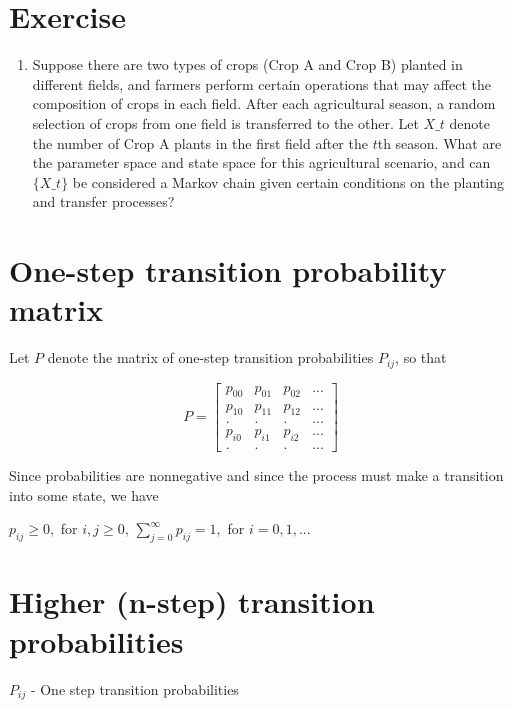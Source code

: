 \documentclass[
  letterpaper,
  DIV=11,
  numbers=noendperiod]{scrreprt}
\providecommand{\tightlist}{%
  \setlength{\itemsep}{0pt}\setlength{\parskip}{0pt}}\usepackage{longtable,booktabs,array}
\begin{document}
\section{Exercise}\label{exercise}

\begin{enumerate}
\def\labelenumi{\arabic{enumi}.}
\tightlist
\item
  Suppose there are two types of crops (Crop A and Crop B) planted in
  different fields, and farmers perform certain operations that may
  affect the composition of crops in each field. After each agricultural
  season, a random selection of crops from one field is transferred to
  the other. Let \(X\_t\) denote the number of Crop A plants in the
  first field after the \(t\)th season. What are the parameter space and
  state space for this agricultural scenario, and can \(\{X\_t\}\) be
  considered a Markov chain given certain conditions on the planting and
  transfer processes?
\end{enumerate}

\section{One-step transition probability
matrix}\label{one-step-transition-probability-matrix}

Let \(P\) denote the matrix of one-step transition probabilities
\(P_{ij}\), so that

\[P = \left[\begin{array}{cccccccc}
p_{00} & p_{01} & p_{02} & ...\\
p_{10} & p_{11} & p_{12} & ...\\
. & . & . & ...\\
p_{i0} & p_{i1} & p_{i2} & ...\\
. & . & . & ...
\end{array}\right]\]

Since probabilities are nonnegative and since the process must make a
transition into some state, we have

\(p_{ij} \geq 0,\) for \(i, j \geq 0\),
\(\sum_{j=0}^\infty p_{ij} = 1,\) for \(i = 0, 1, ...\)

\section{Higher (n-step) transition
probabilities}\label{higher-n-step-transition-probabilities}

\(P_{ij}\) - One step transition probabilities
\end{document}
